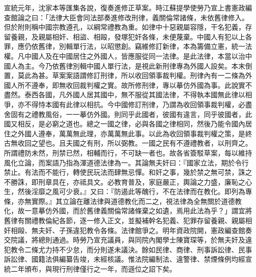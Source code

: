 \begin{pinyinscope}
宣統元年，沈家本等匯集各說，復奏進修正草案。時江蘇提學使勞乃宣上書憲政編查館論之曰：「法律大臣會同法部奏進修改刑律，義關倫常諸條，未依舊律修入。但於附則稱中國宗教遵孔，以綱常禮教為重。如律中十惡親屬容隱，干名犯義，存留養親，及親屬相奸、相盜、相毆，發塚犯奸各條，未便蔑棄。中國人有犯以上各罪，應仍依舊律，別輯單行法，以昭懲創。竊維修訂新律，本為籌備立憲，統一法權。凡中國人及在中國居住之外國人，皆應服從同一法律。是此法律，本當以治中國人為主。今乃依舊律別輯中國人單行法，是視此新刑律專為外國人設矣。本末倒置，莫此為甚。草案案語謂修訂刑律，所以收回領事裁判權。刑律內有一二條為外國人所不遵奉，即無收回裁判權之實。故所修刑律，專以摹仿外國為事。此說實不盡然。泰西各國，凡外國人居其國中，無不服從其國法律，不得執本國無此律以相爭，亦不得恃本國有此律以相抗。今中國修訂刑律，乃謂為收回領事裁判權，必盡舍固有之禮教風俗，一一摹仿外國。則同乎此國者，彼國有違言，同乎彼國者，此國又相反，是必窮之道也。總之一國之律，必與各國之律相同，然後乃能令國內居住之外國人遵奉，萬萬無此理，亦萬萬無此事。以此為收回領事裁判權之策，是終古無收回之望也。且夫國之有刑，所以弼教。一國之民有不遵禮教者，以刑齊之。所謂禮防未然，刑禁已然，相輔而行，不可缺一者也。故各省簽駁草案，每以維持風化立論，而案語乃指為渾道德法律為一。其論無夫奸曰：『國家立法，期於令行禁止。有法而不能行，轉使民玩法而肆無忌憚。和奸之事，幾於禁之無可禁，誅之不勝誅，即刑章具在，亦祗具文。必教育普及，家庭嚴正，輿論之力盛，廉恥之心生，然後淫靡之風可少衰。』又曰：『防遏此等醜行，不在法律而在教化。即列為專條，亦無實際。』其立論在離法律與道德教化而二之，視法律為全無關於道德教化，故一意摹仿外國，而於舊律義關倫常諸條棄之如遺，焉用此法為乎？」謂宜將舊律有關禮教倫紀各節，逐一修入正文，並擬補幹名犯義、犯罪存留養親、親屬相奸相毆、無夫奸、子孫違犯教令各條。法律館爭之。明年資政院開，憲政編查館奏交院議，將總則通過。時勞乃宣充議員，與同院內閣學士陳寶琛等，於無夫奸及違犯教令二條尤力持不少怠，而分則遂未議決。餘如民律、商律、刑事訴訟律、民事訴訟律、國籍法俱編纂告竣，未經核議。惟法院編制法、違警律、禁煙條例均經宣統二年頒布，與現行刑律僅行之一年，而遜位之詔下矣。


\end{pinyinscope}